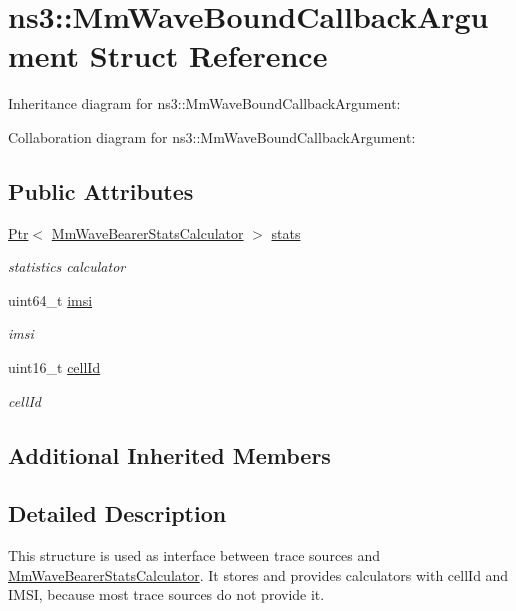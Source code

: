 \hypertarget{structns3_1_1MmWaveBoundCallbackArgument}{}\section{ns3\+:\+:Mm\+Wave\+Bound\+Callback\+Argument Struct Reference}
\label{structns3_1_1MmWaveBoundCallbackArgument}


Inheritance diagram for ns3\+:\+:Mm\+Wave\+Bound\+Callback\+Argument\+:


Collaboration diagram for ns3\+:\+:Mm\+Wave\+Bound\+Callback\+Argument\+:
\subsection*{Public Attributes}
\begin{DoxyCompactItemize}
\item 
\hyperlink{classns3_1_1Ptr}{Ptr}$<$ \hyperlink{classns3_1_1MmWaveBearerStatsCalculator}{Mm\+Wave\+Bearer\+Stats\+Calculator} $>$ \hyperlink{structns3_1_1MmWaveBoundCallbackArgument_a3bf0a946cc963c0c775a522f43ebbc97}{stats}
\begin{DoxyCompactList}\small\item\em statistics calculator \end{DoxyCompactList}\item 
uint64\+\_\+t \hyperlink{structns3_1_1MmWaveBoundCallbackArgument_aa4c070833e5f983be05272a0ca4d0a07}{imsi}
\begin{DoxyCompactList}\small\item\em imsi \end{DoxyCompactList}\item 
uint16\+\_\+t \hyperlink{structns3_1_1MmWaveBoundCallbackArgument_a90fdb4f4e056b2287ddd6500fa2f86d4}{cell\+Id}
\begin{DoxyCompactList}\small\item\em cell\+Id \end{DoxyCompactList}\end{DoxyCompactItemize}
\subsection*{Additional Inherited Members}


\subsection{Detailed Description}
This structure is used as interface between trace sources and \hyperlink{classns3_1_1MmWaveBearerStatsCalculator}{Mm\+Wave\+Bearer\+Stats\+Calculator}. It stores and provides calculators with cell\+Id and I\+M\+SI, because most trace sources do not provide it. 

